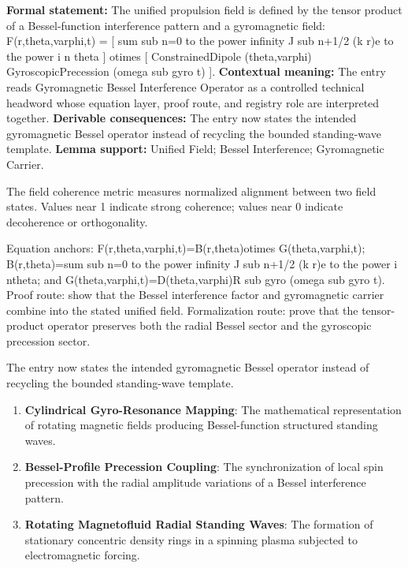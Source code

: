 \begingroup\footnotesize\setlength{\emergencystretch}{3em}\sloppy
\textbf{Formal statement:} The unified propulsion field is defined by the tensor product of a Bessel-function interference pattern and a gyromagnetic field: F(r,theta,varphi,t) = [ sum sub n=0 to the power infinity J sub n+1/2 (k r)e to the power i n theta ] otimes [ ConstrainedDipole (theta,varphi) GyroscopicPrecession (omega sub gyro t) ]. \textbf{Contextual meaning:} The entry reads Gyromagnetic Bessel Interference Operator as a controlled technical headword whose equation layer, proof route, and registry role are interpreted together. \textbf{Derivable consequences:} The entry now states the intended gyromagnetic Bessel operator instead of recycling the bounded standing-wave template. \textbf{Lemma support:} Unified Field; Bessel Interference; Gyromagnetic Carrier.\par
\endgroup

The field coherence metric measures normalized alignment between two field states. Values near 1 indicate strong coherence; values near 0 indicate decoherence or orthogonality.

Equation anchors: F(r,theta,varphi,t)=B(r,theta)otimes G(theta,varphi,t); B(r,theta)=sum sub n=0 to the power infinity J sub n+1/2 (k r)e to the power i ntheta; and G(theta,varphi,t)=D(theta,varphi)R sub gyro (omega sub gyro t). Proof route: show that the Bessel interference factor and gyromagnetic carrier combine into the stated unified field. Formalization route: prove that the tensor-product operator preserves both the radial Bessel sector and the gyroscopic precession sector.

The entry now states the intended gyromagnetic Bessel operator instead of recycling the bounded standing-wave template.
\endgroup

\begin{enumerate}[leftmargin=1.6em,itemsep=6pt,topsep=4pt]
\item \textbf{Cylindrical Gyro-Resonance Mapping}: The mathematical representation of rotating magnetic fields producing Bessel-function structured standing waves.
\item \textbf{Bessel-Profile Precession Coupling}: The synchronization of local spin precession with the radial amplitude variations of a Bessel interference pattern.
\item \textbf{Rotating Magnetofluid Radial Standing Waves}: The formation of stationary concentric density rings in a spinning plasma subjected to electromagnetic forcing.
\end{enumerate}

